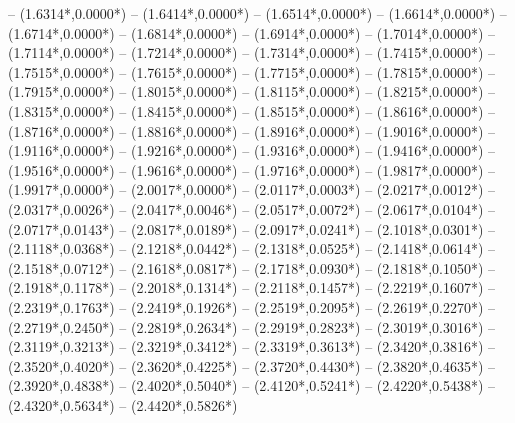 {	-- ({1.6314*\dx},{0.0000*\dy})
	-- ({1.6414*\dx},{0.0000*\dy})
	-- ({1.6514*\dx},{0.0000*\dy})
	-- ({1.6614*\dx},{0.0000*\dy})
	-- ({1.6714*\dx},{0.0000*\dy})
	-- ({1.6814*\dx},{0.0000*\dy})
	-- ({1.6914*\dx},{0.0000*\dy})
	-- ({1.7014*\dx},{0.0000*\dy})
	-- ({1.7114*\dx},{0.0000*\dy})
	-- ({1.7214*\dx},{0.0000*\dy})
	-- ({1.7314*\dx},{0.0000*\dy})
	-- ({1.7415*\dx},{0.0000*\dy})
	-- ({1.7515*\dx},{0.0000*\dy})
	-- ({1.7615*\dx},{0.0000*\dy})
	-- ({1.7715*\dx},{0.0000*\dy})
	-- ({1.7815*\dx},{0.0000*\dy})
	-- ({1.7915*\dx},{0.0000*\dy})
	-- ({1.8015*\dx},{0.0000*\dy})
	-- ({1.8115*\dx},{0.0000*\dy})
	-- ({1.8215*\dx},{0.0000*\dy})
	-- ({1.8315*\dx},{0.0000*\dy})
	-- ({1.8415*\dx},{0.0000*\dy})
	-- ({1.8515*\dx},{0.0000*\dy})
	-- ({1.8616*\dx},{0.0000*\dy})
	-- ({1.8716*\dx},{0.0000*\dy})
	-- ({1.8816*\dx},{0.0000*\dy})
	-- ({1.8916*\dx},{0.0000*\dy})
	-- ({1.9016*\dx},{0.0000*\dy})
	-- ({1.9116*\dx},{0.0000*\dy})
	-- ({1.9216*\dx},{0.0000*\dy})
	-- ({1.9316*\dx},{0.0000*\dy})
	-- ({1.9416*\dx},{0.0000*\dy})
	-- ({1.9516*\dx},{0.0000*\dy})
	-- ({1.9616*\dx},{0.0000*\dy})
	-- ({1.9716*\dx},{0.0000*\dy})
	-- ({1.9817*\dx},{0.0000*\dy})
	-- ({1.9917*\dx},{0.0000*\dy})
	-- ({2.0017*\dx},{0.0000*\dy})
	-- ({2.0117*\dx},{0.0003*\dy})
	-- ({2.0217*\dx},{0.0012*\dy})
	-- ({2.0317*\dx},{0.0026*\dy})
	-- ({2.0417*\dx},{0.0046*\dy})
	-- ({2.0517*\dx},{0.0072*\dy})
	-- ({2.0617*\dx},{0.0104*\dy})
	-- ({2.0717*\dx},{0.0143*\dy})
	-- ({2.0817*\dx},{0.0189*\dy})
	-- ({2.0917*\dx},{0.0241*\dy})
	-- ({2.1018*\dx},{0.0301*\dy})
	-- ({2.1118*\dx},{0.0368*\dy})
	-- ({2.1218*\dx},{0.0442*\dy})
	-- ({2.1318*\dx},{0.0525*\dy})
	-- ({2.1418*\dx},{0.0614*\dy})
	-- ({2.1518*\dx},{0.0712*\dy})
	-- ({2.1618*\dx},{0.0817*\dy})
	-- ({2.1718*\dx},{0.0930*\dy})
	-- ({2.1818*\dx},{0.1050*\dy})
	-- ({2.1918*\dx},{0.1178*\dy})
	-- ({2.2018*\dx},{0.1314*\dy})
	-- ({2.2118*\dx},{0.1457*\dy})
	-- ({2.2219*\dx},{0.1607*\dy})
	-- ({2.2319*\dx},{0.1763*\dy})
	-- ({2.2419*\dx},{0.1926*\dy})
	-- ({2.2519*\dx},{0.2095*\dy})
	-- ({2.2619*\dx},{0.2270*\dy})
	-- ({2.2719*\dx},{0.2450*\dy})
	-- ({2.2819*\dx},{0.2634*\dy})
	-- ({2.2919*\dx},{0.2823*\dy})
	-- ({2.3019*\dx},{0.3016*\dy})
	-- ({2.3119*\dx},{0.3213*\dy})
	-- ({2.3219*\dx},{0.3412*\dy})
	-- ({2.3319*\dx},{0.3613*\dy})
	-- ({2.3420*\dx},{0.3816*\dy})
	-- ({2.3520*\dx},{0.4020*\dy})
	-- ({2.3620*\dx},{0.4225*\dy})
	-- ({2.3720*\dx},{0.4430*\dy})
	-- ({2.3820*\dx},{0.4635*\dy})
	-- ({2.3920*\dx},{0.4838*\dy})
	-- ({2.4020*\dx},{0.5040*\dy})
	-- ({2.4120*\dx},{0.5241*\dy})
	-- ({2.4220*\dx},{0.5438*\dy})
	-- ({2.4320*\dx},{0.5634*\dy})
	-- ({2.4420*\dx},{0.5826*\dy})
}
